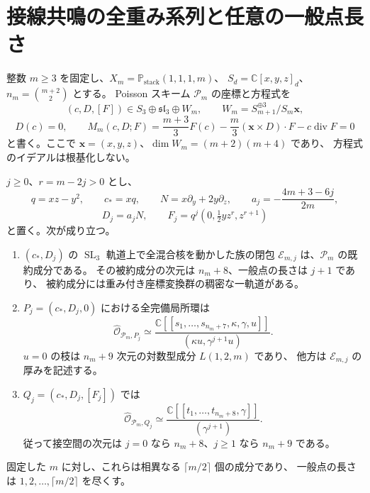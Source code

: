 \section{接線共鳴の全重み系列と任意の一般点長さ}
\label{sec:tangent-resonance-allm-v34}

整数 $m\geq3$ を固定し、$X_m=\mathbb P_{\mathrm{stack}}(1,1,1,m)$、
$S_d=\mathbb C[x,y,z]_d$、$n_m=\binom{m+2}{2}$ とする。
Poisson スキーム $\mathscr P_m$ の座標と方程式を
\[
 (c,D,[F])\in S_3\oplus\mathfrak{sl}_3\oplus W_m,
 \qquad W_m=S_{m+1}^{\oplus3}/S_m\mathbf x,
\]
\begin{equation}
 D(c)=0,\qquad
 M_m(c,D;F)=\frac{m+3}{3}F(c)
 -\frac m3(\mathbf x\times D)\cdot F-c\operatorname{div}F=0
 \label{eq:resonance-mixed-allm-v34}
\end{equation}
と書く。ここで $\mathbf x=(x,y,z)$、$\dim W_m=(m+2)(m+4)$ であり、
方程式のイデアルは根基化しない。

\begin{theorem}[接線共鳴系列の全形式近傍]
\label{thm:tangent-resonance-allm-v34}
$j\geq0$、$r=m-2j>0$ とし、
\[
 q=xz-y^2,\qquad c_*=xq,\qquad N=x\partial_y+2y\partial_z,
 \qquad a_j=-\frac{4m+3-6j}{2m},
\]
\[
 D_j=a_jN,\qquad
 F_j=q^j(0,\tfrac12yz^r,z^{r+1})
\]
と置く。次が成り立つ。
\begin{enumerate}
\item $(c_*,D_j)$ の $\operatorname{SL}_3$ 軌道上で全混合核を動かした族の閉包
 $\mathscr E_{m,j}$ は、$\mathscr P_m$ の既約成分である。
 その被約成分の次元は $n_m+8$、一般点の長さは $j+1$ であり、
 被約成分には重み付き座標変換群の稠密な一軌道がある。
\item $P_j=(c_*,D_j,0)$ における全完備局所環は
 \begin{equation}
 \boxed{\quad
 \widehat{\mathcal O}_{\mathscr P_m,P_j}
 \simeq
 \frac{\mathbb C[[s_1,\ldots,s_{n_m+7},\kappa,\gamma,u]]}
 {(\kappa u,\gamma^{j+1}u)}.
 \quad}
 \label{eq:tangent-resonance-origin-v34}
 \end{equation}
 $u=0$ の枝は $n_m+9$ 次元の対数型成分 $L(1,2,m)$ であり、
 他方は $\mathscr E_{m,j}$ の厚みを記述する。
\item $Q_j=(c_*,D_j,[F_j])$ では
 \begin{equation}
 \widehat{\mathcal O}_{\mathscr P_m,Q_j}
 \simeq
 \frac{\mathbb C[[t_1,\ldots,t_{n_m+8},\gamma]]}{(\gamma^{j+1})}.
 \label{eq:tangent-resonance-nonzero-v34}
 \end{equation}
 従って接空間の次元は $j=0$ なら $n_m+8$、$j\geq1$ なら $n_m+9$ である。
\end{enumerate}
固定した $m$ に対し、これらは相異なる $\lceil m/2\rceil$ 個の成分であり、
一般点の長さは $1,2,\ldots,\lceil m/2\rceil$ を尽くす。
\end{theorem}

